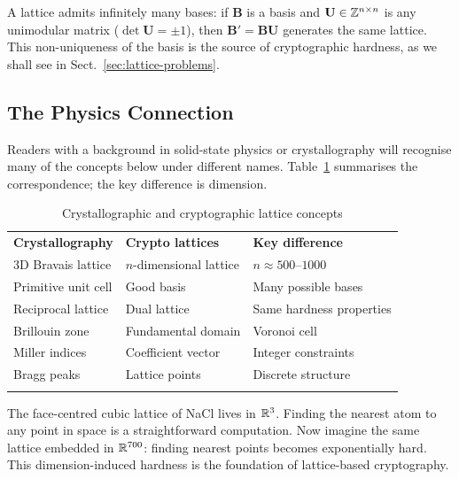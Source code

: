 A lattice admits infinitely many bases: if $\mathbf{B}$ is a basis and $\mathbf{U}\in\mathbb{Z}^{n\times n}$ is any unimodular matrix ($\det\mathbf{U}=\pm 1$), then $\mathbf{B}' = \mathbf{B}\mathbf{U}$ generates the same lattice.  This non-uniqueness of the basis is the source of cryptographic hardness, as we shall see in Sect.~\ref{sec:lattice-problems}.


\subsection{The Physics Connection}
\label{subsec:physics-connection}

Readers with a background in solid-state physics or crystallography will recognise many of the concepts below under different names.  Table~\ref{tab:physics-lattice} summarises the correspondence; the key difference is dimension.

\begin{table}[t]
\caption{Crystallographic and cryptographic lattice concepts}
\label{tab:physics-lattice}
\begin{tabular}{p{3.5cm}p{4cm}p{4cm}}
\hline\noalign{\smallskip}
\textbf{Crystallography} & \textbf{Crypto lattices} & \textbf{Key difference} \\
\noalign{\smallskip}\svhline\noalign{\smallskip}
3D Bravais lattice & $n$-dimensional lattice & $n \approx 500$--$1000$ \\
Primitive unit cell & Good basis & Many possible bases \\
Reciprocal lattice & Dual lattice & Same hardness properties \\
Brillouin zone & Fundamental domain & Voronoi cell \\
Miller indices & Coefficient vector & Integer constraints \\
Bragg peaks & Lattice points & Discrete structure \\
\noalign{\smallskip}\hline
\end{tabular}
\end{table}

\begin{example}
\label{ex:nacl}
The face-centred cubic lattice of NaCl lives in $\mathbb{R}^3$.  Finding the nearest atom to any point in space is a straightforward computation.  Now imagine the same lattice embedded in $\mathbb{R}^{700}$: finding nearest points becomes exponentially hard.  This dimension-induced hardness is the foundation of lattice-based cryptography.
\end{example}

